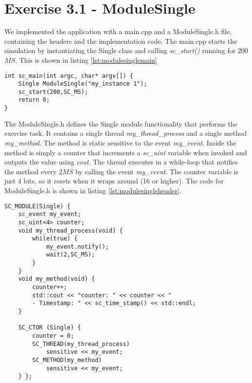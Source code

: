 \section{Exercise 3.1 - ModuleSingle}

We implemented the application with a main.cpp and a ModuleSingle.h file, containing the headers and the implementation code. The main.cpp starts the simulation by instantiating the Single class and calling \textit{sc\_start()} running for 200$MS$. This is shown in listing \ref{lst:modulesinglemain}

\begin{lstlisting}[style=customc++, caption=Application file for ModuleSingle,
label={lst:modulesinglemain}]
int sc_main(int argc, char* argv[]) {
	Single ModuleSingle("my_instance 1");
	sc_start(200,SC_MS);
	return 0;
}
\end{lstlisting}

\noindent The ModuleSingle.h defines the Single module functionality that performs the exercise task. It contains a single thread \textit{my\_thread\_process} and a single method \textit{my\_method}. The method is static sensitive to the event \textit{my\_event}. Inside the method is simply a counter that increments a \textit{sc\_uint} variable when invoked and outputs the value using \textit{cout}. The thread executes in a while-loop that notifies the method every 2$MS$ by calling the event \textit{my\_event}. The counter variable is just 4 bits, so it resets when it wraps around (16 or higher). The code for ModuleSingle.h is shown in listing \ref{lst:modulesingleheader}.

\begin{lstlisting}[style=customc++, caption=Implementation of ModuleSingle,
label={lst:modulesingleheader}]
SC_MODULE(Single) {
	sc_event my_event;
	sc_uint<4> counter;
	void my_thread_process(void) {
		while(true) {
			my_event.notify();
			wait(2,SC_MS);
		}
	}
	void my_method(void) {
		counter++;
		std::cout << "counter: " << counter << "
		- Timestamp: " << sc_time_stamp() << std::endl;
	}
	
	SC_CTOR (Single) {
		counter = 0;
		SC_THREAD(my_thread_process)
			sensitive << my_event;
		SC_METHOD(my_method)
			sensitive << my_event;
	} };
\end{lstlisting}